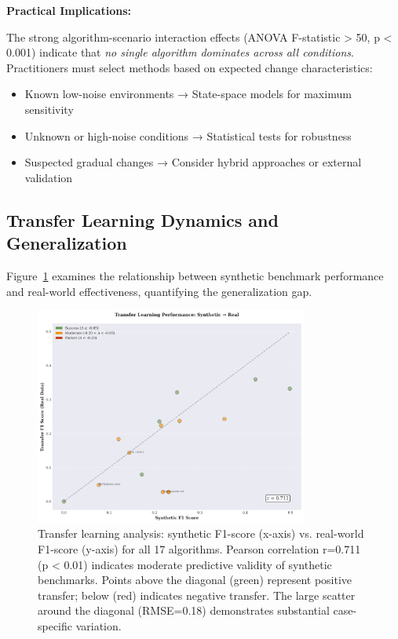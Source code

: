 \documentclass[journal,article,submit,pdftex,moreauthors]{Definitions/mdpi}
\begin{document}
\textbf{Practical Implications:}

The strong algorithm-scenario interaction effects (ANOVA F-statistic > 50, p < 0.001) indicate that \textit{no single algorithm dominates across all conditions}. Practitioners must select methods based on expected change characteristics:
\begin{itemize}
    \item Known low-noise environments → State-space models for maximum sensitivity
    \item Unknown or high-noise conditions → Statistical tests for robustness
    \item Suspected gradual changes → Consider hybrid approaches or external validation
\end{itemize}


\subsection{Transfer Learning Dynamics and Generalization}

Figure~\ref{fig:transfer_learning_scatter} examines the relationship between synthetic benchmark performance and real-world effectiveness, quantifying the generalization gap.

\begin{figure}[H]
\centering
\includegraphics[width=0.80\textwidth]{figures/fig_transfer_learning_scatter.png}
\caption{Transfer learning analysis: synthetic F1-score (x-axis) vs. real-world F1-score (y-axis) for all 17 algorithms. Pearson correlation r=0.711 (p < 0.01) indicates moderate predictive validity of synthetic benchmarks. Points above the diagonal (green) represent positive transfer; below (red) indicates negative transfer. The large scatter around the diagonal (RMSE=0.18) demonstrates substantial case-specific variation.}
\label{fig:transfer_learning_scatter}
\end{figure}
\end{document}
